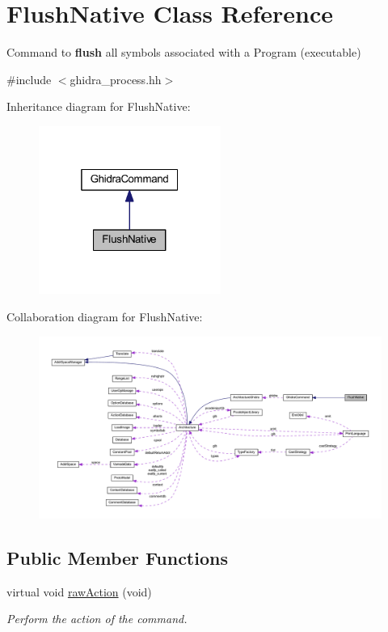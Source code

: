 \hypertarget{class_flush_native}{}\section{Flush\+Native Class Reference}
\label{class_flush_native}


Command to {\bfseries{flush}} all symbols associated with a Program (executable)  




{\ttfamily \#include $<$ghidra\+\_\+process.\+hh$>$}



Inheritance diagram for Flush\+Native\+:
\nopagebreak
\begin{figure}[H]
\begin{center}
\leavevmode
\includegraphics[width=169pt]{class_flush_native__inherit__graph}
\end{center}
\end{figure}


Collaboration diagram for Flush\+Native\+:
\nopagebreak
\begin{figure}[H]
\begin{center}
\leavevmode
\includegraphics[width=350pt]{class_flush_native__coll__graph}
\end{center}
\end{figure}
\subsection*{Public Member Functions}
\begin{DoxyCompactItemize}
\item 
virtual void \mbox{\hyperlink{class_flush_native_a92fb03dcd3fb080a2033442403cde93c}{raw\+Action}} (void)
\begin{DoxyCompactList}\small\item\em Perform the action of the command. \end{DoxyCompactList}\end{DoxyCompactItemize}
